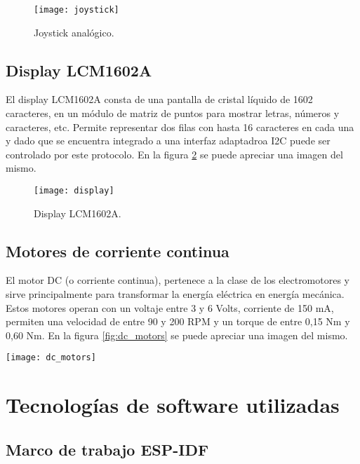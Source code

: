 \begin{figure}[h]
    \centering
    \texttt{[image: joystick]}
    \caption{Joystick analógico.}
    \label{fig:joystick}
\end{figure}


\subsection{Display LCM1602A}
El display LCM1602A consta de una pantalla de cristal líquido de 1602 caracteres, en un módulo de matriz de puntos para mostrar letras, números y caracteres, etc. Permite representar dos filas con hasta 16 caracteres en cada una y dado que se encuentra integrado a una interfaz adaptadroa I2C puede ser controlado por este protocolo. En la figura \ref{fig:display} se puede apreciar una imagen del mismo.

\begin{figure}[h]
    \centering
    \texttt{[image: display]}
    \caption{Display LCM1602A.}
    \label{fig:display}
\end{figure}

\subsection{Motores de corriente continua}
El motor DC (o corriente continua), pertenece a la clase de los electromotores y sirve principalmente para transformar la energía eléctrica en energía mecánica. Estos motores operan con un voltaje entre 3 y 6 Volts, corriente de 150 mA, permiten una velocidad de entre 90 y 200 RPM y un torque de entre 0,15 Nm y 0,60 Nm. En la figura \ref{fig:dc_motors} se puede apreciar una imagen del mismo.


\begin{center}
  \texttt{[image: dc\_motors]}
    \label{fig:dc_motors}
\end{center}
  



\section{Tecnologías de software utilizadas} 

\subsection{Marco de trabajo ESP-IDF}

